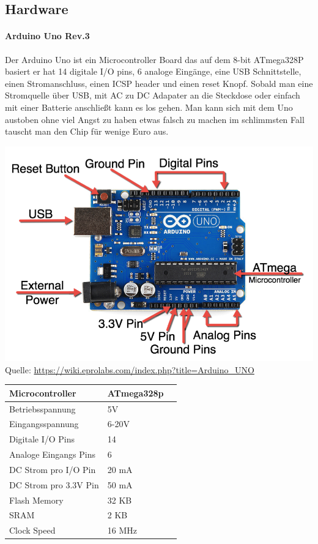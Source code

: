 \documentclass[12pt]{article}
\newcommand*{\quelle}{%
  \footnotesize Quelle: 
}
\begin{document}
\subsection{Hardware}
\paragraph{Arduino Uno Rev.3} Der Arduino Uno ist ein Microcontroller Board das auf dem 8-bit ATmega328P basiert er hat 14 digitale I/O pins, 6 analoge Eingänge, eine USB Schnittstelle, einen Stromanschluss, einen ICSP header und einen reset Knopf. Sobald man eine Stromquelle über USB, mit AC zu DC Adapater an die Steckdose  oder einfach mit einer Batterie anschließt kann es los gehen. Man kann sich mit dem Uno austoben ohne viel Angst zu haben etwas falsch zu machen im schlimmsten Fall tauscht man den Chip für wenige Euro aus.

\includegraphics[width=1\textwidth]{ArduinoParts.png}
\quelle\url{https://wiki.eprolabs.com/index.php?title=Arduino_UNO}

\vspace{0.5cm}
\begin{tabularx}{\columnwidth}{XXl}
  Microcontroller&ATmega328p\\
  \hline
  Betriebsspannung&5V\\
  \hline
  Eingangsspannung&6-20V\\
  \hline
  Digitale I/O Pins&14\\
  \hline
  Analoge Eingangs Pins&6\\
  \hline
  DC Strom pro I/O Pin&20 mA\\
  \hline
  DC Strom pro 3.3V Pin&50 mA\\
  \hline
  Flash Memory&32 KB\\
  \hline
  SRAM&2 KB\\
  \hline
  Clock Speed&16 MHz\\
\end{tabularx}
\newpage
\end{document}
